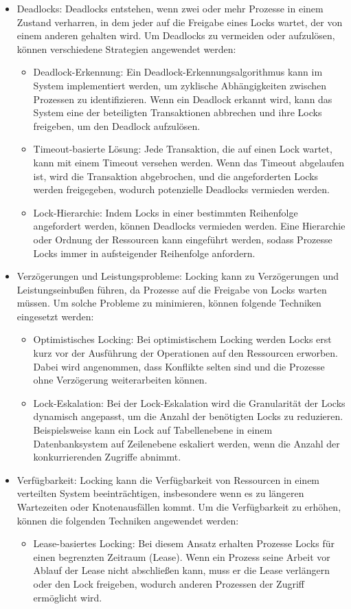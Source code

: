 \begin{itemize}
\item Deadlocks: Deadlocks entstehen, wenn zwei oder mehr Prozesse in einem Zustand verharren, in dem jeder auf die Freigabe eines Locks wartet, der von einem anderen gehalten wird. Um Deadlocks zu vermeiden oder aufzulösen, können verschiedene Strategien angewendet werden:
\begin{itemize}
\item Deadlock-Erkennung: Ein Deadlock-Erkennungsalgorithmus kann im System implementiert werden, um zyklische Abhängigkeiten zwischen Prozessen zu identifizieren. Wenn ein Deadlock erkannt wird, kann das System eine der beteiligten Transaktionen abbrechen und ihre Locks freigeben, um den Deadlock aufzulösen.

\item Timeout-basierte Lösung: Jede Transaktion, die auf einen Lock wartet, kann mit einem Timeout versehen werden. Wenn das Timeout abgelaufen ist, wird die Transaktion abgebrochen, und die angeforderten Locks werden freigegeben, wodurch potenzielle Deadlocks vermieden werden.

\item Lock-Hierarchie: Indem Locks in einer bestimmten Reihenfolge angefordert werden, können Deadlocks vermieden werden. Eine Hierarchie oder Ordnung der Ressourcen kann eingeführt werden, sodass Prozesse Locks immer in aufsteigender Reihenfolge anfordern.
\end{itemize}
\item Verzögerungen und Leistungsprobleme: Locking kann zu Verzögerungen und Leistungseinbußen führen, da Prozesse auf die Freigabe von Locks warten müssen. Um solche Probleme zu minimieren, können folgende Techniken eingesetzt werden:
\begin{itemize}
\item Optimistisches Locking: Bei optimistischem Locking werden Locks erst kurz vor der Ausführung der Operationen auf den Ressourcen erworben. Dabei wird angenommen, dass Konflikte selten sind und die Prozesse ohne Verzögerung weiterarbeiten können.

\item Lock-Eskalation: Bei der Lock-Eskalation wird die Granularität der Locks dynamisch angepasst, um die Anzahl der benötigten Locks zu reduzieren. Beispielsweise kann ein Lock auf Tabellenebene in einem Datenbanksystem auf Zeilenebene eskaliert werden, wenn die Anzahl der konkurrierenden Zugriffe abnimmt.
\end{itemize}
\item Verfügbarkeit: Locking kann die Verfügbarkeit von Ressourcen in einem verteilten System beeinträchtigen, insbesondere wenn es zu längeren Wartezeiten oder Knotenausfällen kommt. Um die Verfügbarkeit zu erhöhen, können die folgenden Techniken angewendet werden:
\begin{itemize}
\item Lease-basiertes Locking: Bei diesem Ansatz erhalten Prozesse Locks für einen begrenzten Zeitraum (Lease). Wenn ein Prozess seine Arbeit vor Ablauf der Lease nicht abschließen kann, muss er die Lease verlängern oder den Lock freigeben, wodurch anderen Prozessen der Zugriff ermöglicht wird.


\end{itemize}
\end{itemize}
